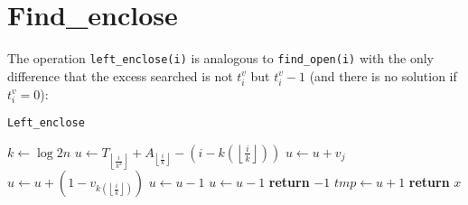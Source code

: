 \documentclass{article}
\begin{document}
\section{Find\_enclose}
The operation \texttt{left\_enclose(i)} is analogous to \texttt{find\_open(i)} with the only difference that the excess searched is not $t^v_i$ but $t^v_i-1$ (and there is no solution if $t^v_i=0$):
    \begin{algorithm}[H]
    \caption{\texttt{Left\_enclose}}\label{leftenclose}
    \begin{algorithmic}[1]
        \State $k\gets\log{2n}$
        \State $u\gets T_{\left\lfloor{\frac{i}{k^2}}\right\rfloor}+A_{\left\lfloor{\frac{i}{k}}\right\rfloor}-(i-k(\left\lfloor{\frac{i}{k}}\right\rfloor))$
            \State $u\gets u+v_j$
        \EndFor
        \State $u\gets u+(1-v_{k(\left\lfloor{\frac{i}{k}}\right\rfloor)})$
            \State $u\gets u-1$
        \EndIf
        \State $u\gets u-1$
            \State \textbf{return} $-1$ 
        \EndIf
        \State
        \State $tmp\gets u+1$
                \State \textbf{return} $x$
            \EndIf
    \end{algorithmic}
    \end{algorithm}
\end{document}
